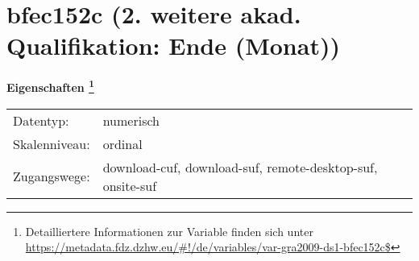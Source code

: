 
    \setcounter{footnote}{0}

    \vspace*{-1.8cm}
	\section{bfec152c (2. weitere akad. Qualifikation: Ende (Monat))}
	\label{section:bfec152c}



    \vspace*{0.5cm}
    \noindent\textbf{Eigenschaften
	\footnote{Detailliertere Informationen zur Variable finden sich unter
		\url{https://metadata.fdz.dzhw.eu/\#!/de/variables/var-gra2009-ds1-bfec152c$}}}\\
	\begin{tabularx}{\hsize}{@{}lX}
	Datentyp: & numerisch \\
	Skalenniveau: & ordinal \\
	Zugangswege: &
	  download-cuf, 
	  download-suf, 
	  remote-desktop-suf, 
	  onsite-suf
 \\
    \end{tabularx}




